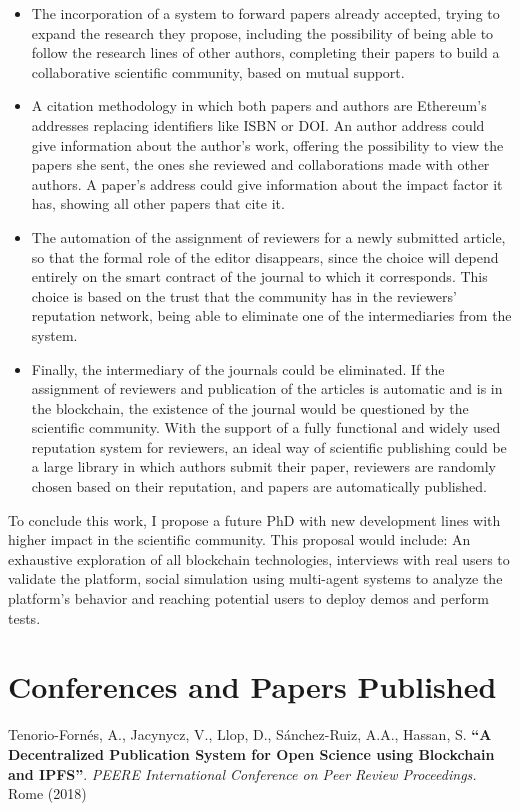 \begin{itemize}
\item The incorporation of a system to forward papers already accepted, trying
  to expand the research they propose, including the possibility of being able
  to follow the research lines of other authors, completing their papers to
  build a collaborative scientific community, based on mutual support.
\item A citation methodology in which both papers and authors are Ethereum's
  addresses replacing identifiers like ISBN or DOI. An author address could give
  information about the author's work, offering the possibility to view the
  papers she sent, the ones she reviewed and collaborations made with other
  authors. A paper's address could give information about the impact factor it
  has, showing all other papers that cite it.
\item The automation of the assignment of reviewers for a newly submitted
  article, so that the formal role of the editor disappears, since the choice
  will depend entirely on the smart contract of the journal to which it
  corresponds. This choice is based on the trust that the community has in the
  reviewers' reputation network, being able to eliminate one of the
  intermediaries from the system.
\item Finally, the intermediary of the journals could be eliminated. If the
  assignment of reviewers and publication of the articles is automatic and is in
  the blockchain, the existence of the journal would be questioned by the
  scientific community. With the support of a fully functional and widely used
  reputation system for reviewers, an ideal way of scientific publishing could
  be a large library in which authors submit their paper, reviewers are randomly
  chosen based on their reputation, and papers are automatically published.
\end{itemize}

To conclude this work, I propose a future PhD with new development lines with
higher impact in the scientific community. This proposal would include: An
exhaustive exploration of all blockchain technologies, interviews with real
users to validate the platform, social simulation using multi-agent systems to
analyze the platform's behavior and reaching potential users to deploy demos and
perform tests.

\section{Conferences and Papers Published}

Tenorio-Fornés, A., Jacynycz, V., Llop, D., Sánchez-Ruiz, A.A., Hassan, S.
\textbf{“A Decentralized Publication System for Open Science using Blockchain
  and IPFS”}. \emph{PEERE International Conference on Peer Review Proceedings.}
Rome (2018)

